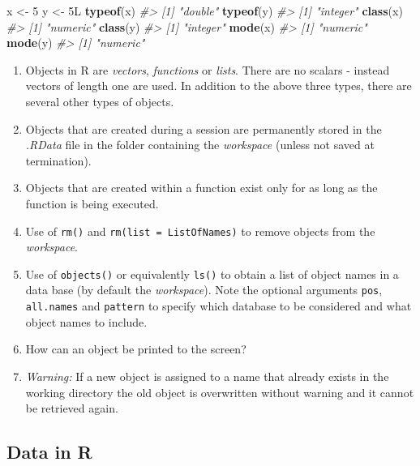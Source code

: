 \documentclass[
]{book}
\newenvironment{Shaded}{\begin{snugshade}}{\end{snugshade}}
\newcommand{\CommentTok}[1]{\textcolor[rgb]{0.56,0.35,0.01}{\textit{#1}}}
\newcommand{\DataTypeTok}[1]{\textcolor[rgb]{0.13,0.29,0.53}{#1}}
\newcommand{\DecValTok}[1]{\textcolor[rgb]{0.00,0.00,0.81}{#1}}
\newcommand{\FunctionTok}[1]{\textcolor[rgb]{0.13,0.29,0.53}{\textbf{#1}}}
\newcommand{\NormalTok}[1]{#1}
\newcommand{\OtherTok}[1]{\textcolor[rgb]{0.56,0.35,0.01}{#1}}
\begin{document}
\begin{Shaded}
\begin{Highlighting}[]
\NormalTok{x }\OtherTok{\textless{}{-}} \DecValTok{5}
\NormalTok{y }\OtherTok{\textless{}{-}} \DecValTok{5}\DataTypeTok{L}
\FunctionTok{typeof}\NormalTok{(x)}
\CommentTok{\#\textgreater{} [1] "double"}
\FunctionTok{typeof}\NormalTok{(y)}
\CommentTok{\#\textgreater{} [1] "integer"}
\FunctionTok{class}\NormalTok{(x)}
\CommentTok{\#\textgreater{} [1] "numeric"}
\FunctionTok{class}\NormalTok{(y)}
\CommentTok{\#\textgreater{} [1] "integer"}
\FunctionTok{mode}\NormalTok{(x)}
\CommentTok{\#\textgreater{} [1] "numeric"}
\FunctionTok{mode}\NormalTok{(y)}
\CommentTok{\#\textgreater{} [1] "numeric"}
\end{Highlighting}
\end{Shaded}

\begin{enumerate}
\def\labelenumi{(\alph{enumi})}
\setcounter{enumi}{5}
\item
  Objects in R are \emph{{vectors}}, \emph{{functions}} or \emph{{lists}}. There are no scalars - instead vectors of length one are used. In addition to the above three types, there are several other types of objects.
\item
  Objects that are created during a session are permanently stored in the \emph{{.RData}} file in the folder containing the \emph{{workspace}} (unless not saved at termination).
\item
  Objects that are created within a function exist only for as long as the function is being executed.
\item
  Use of \texttt{rm()} and \texttt{rm(list\ =\ ListOfNames)} to remove objects from the \emph{{workspace}}.
\item
  Use of \texttt{objects()} or equivalently \texttt{ls()} to obtain a list of object names in a data base (by default the \emph{{workspace}}). Note the optional arguments \texttt{pos}, \texttt{all.names} and \texttt{pattern} to specify which database to be considered and what object names to include.
\item
  How can an object be printed to the screen?
\item
  \emph{{Warning:}} If a new object is assigned to a name that already exists in the working directory the old object is overwritten without warning and it cannot be retrieved again.
\end{enumerate}

\subsection{Data in R}\label{data-in-r}
\end{document}
